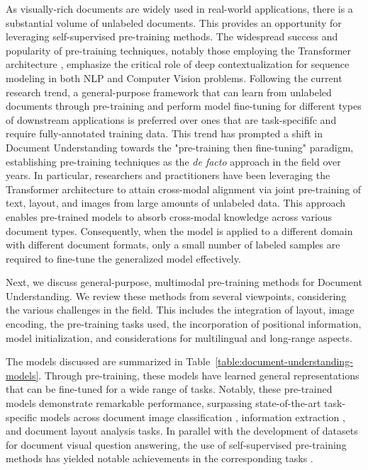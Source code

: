 As visually-rich documents are widely used in real-world applications, there is a substantial volume of unlabeled documents. This provides an opportunity for leveraging self-supervised pre-training methods. The widespread success and popularity of pre-training techniques, notably those employing the Transformer architecture \citep{vaswani2017attention}, emphasize the critical role of deep contextualization for sequence modeling in both \ac{NLP} and Computer Vision problems. Following the current research trend, a general-purpose framework that can learn from unlabeled documents through pre-training and perform model fine-tuning for different types of downstream applications is preferred over ones that are task-specififc and require fully-annotated training data. This trend has prompted a shift in Document Understanding towards the "pre-training then fine-tuning" paradigm, establishing pre-training techniques as the \textit{de facto} approach in the field over years. In particular, researchers and practitioners have been leveraging the Transformer architecture to attain cross-modal alignment via joint pre-training of text, layout, and images from large amounts of unlabeled data. This approach enables pre-trained models to absorb cross-modal knowledge across various document types. Consequently, when the model is applied to a different domain with different document formats, only a small number of labeled samples are required to fine-tune the generalized model effectively. 

Next, we discuss general-purpose, multimodal pre-training methods for Document Understanding. We review these methods from several viewpoints, considering the various challenges in the field. This includes the integration of layout, image encoding, the pre-training tasks used, the incorporation of positional information, model initialization, and considerations for multilingual and long-range aspects. 

The models discussed are summarized in Table~\ref{table:document-understanding-models}. Through pre-training, these models have learned general representations that can be fine-tuned for a wide range of tasks. Notably, these pre-trained models demonstrate remarkable performance, surpassing state-of-the-art task-specific models across document image classification \citep{xu2020layoutlmv2}, information extraction \citep{peng2022ernie}, and document layout analysis \citep{li2020docbank} tasks. In parallel with the development of datasets for document visual question answering, the use of self-supervised pre-training methods has yielded notable achievements in the corresponding tasks \citep{appalaraju2021docformer, tanaka2021visualmrc}. 


